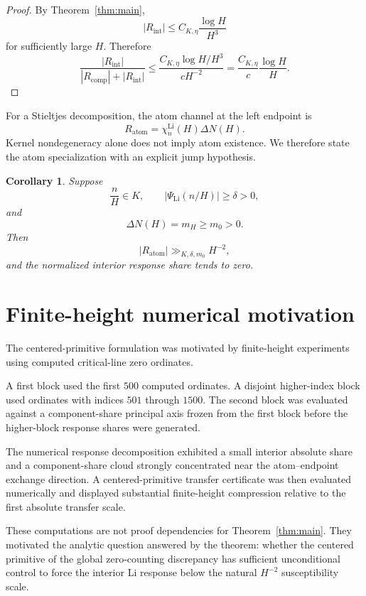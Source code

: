 \documentclass[11pt]{article}
\newtheorem{corollary}[theorem]{Corollary}
\newcommand{\LiSus}{\chi^{\mathrm{Li}}}
\newcommand{\Rint}{R_{\mathrm{int}}}
\begin{document}
\begin{proof}
By Theorem~\ref{thm:main},
\[
|\Rint|
\le
C_{K,\eta}
\frac{\log H}{H^3}
\]
for sufficiently large \(H\). Therefore
\[
\frac{|\Rint|}
{
|R_{\mathrm{comp}}|+|\Rint|
}
\le
\frac{
C_{K,\eta}\log H/H^3
}{
cH^{-2}
}
=
\frac{C_{K,\eta}}{c}
\frac{\log H}{H}.
\]
\end{proof}

For a Stieltjes decomposition, the atom channel at the left endpoint is
\[
R_{\mathrm{atom}}
=
\LiSus_n(H)\Delta N(H).
\]
Kernel nondegeneracy alone does not imply atom existence. We therefore
state the atom specialization with an explicit jump hypothesis.

\begin{corollary}
\label{cor:atom-share}
Suppose
\[
\frac nH\in K,
\qquad
|\Psi_{\mathrm{Li}}(n/H)|
\ge\delta>0,
\]
and
\[
\Delta N(H)=m_H\ge m_0>0.
\]
Then
\[
|R_{\mathrm{atom}}|
\gg_{K,\delta,m_0}
H^{-2},
\]
and the normalized interior response share tends to zero.
\end{corollary}

\section{Finite-height numerical motivation}

The centered-primitive formulation was motivated by finite-height
experiments using computed critical-line zero ordinates.

A first block used the first \(500\) computed ordinates. A disjoint
higher-index block used ordinates with indices \(501\) through \(1500\).
The second block was evaluated against a component-share principal
axis frozen from the first block before the higher-block response
shares were generated.

The numerical response decomposition exhibited a small interior
absolute share and a component-share cloud strongly concentrated near
the atom--endpoint exchange direction. A centered-primitive transfer
certificate was then evaluated numerically and displayed substantial
finite-height compression relative to the first absolute transfer
scale.

These computations are not proof dependencies for
Theorem~\ref{thm:main}. They motivated the analytic question answered
by the theorem: whether the centered primitive of the global
zero-counting discrepancy has sufficient unconditional control to
force the interior Li response below the natural \(H^{-2}\)
susceptibility scale.
\end{document}

